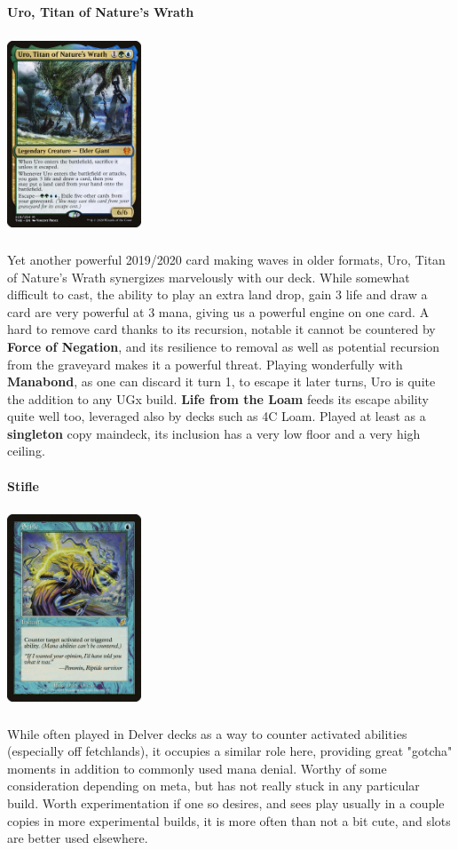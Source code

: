 \documentclass{report}
\begin{document}
\textbf{Uro, Titan of Nature's Wrath\\}
\begin{center}
\includegraphics [width = 4cm, height = 6cm] {uro}
\end{center}
Yet another powerful 2019/2020 card making waves in older formats, Uro, Titan of Nature's Wrath synergizes marvelously with our deck. While somewhat difficult to cast, the ability to play an extra land drop, gain 3 life and draw a card are very powerful at 3 mana, giving us a powerful engine on one card. A hard to remove card thanks to its recursion, notable it cannot be countered by \textbf{Force of Negation}, and its resilience to removal as well as potential recursion from the graveyard makes it a powerful threat. Playing wonderfully with \textbf{Manabond}, as one can discard it turn 1, to escape it later turns, Uro is quite the addition to any UGx build. \textbf{Life from the Loam} feeds its escape ability quite well too, leveraged also by decks such as 4C Loam. Played at least as a \textbf{singleton} copy maindeck, its inclusion has a very low floor and a very high ceiling.\\\\
\newpage
\textbf{Stifle}
\begin{center}
\includegraphics [width = 4cm, height = 6cm] {stifle}
\end{center}
While often played in Delver decks as a way to counter activated abilities (especially off fetchlands), it occupies a similar role here, providing great "gotcha" moments in addition to commonly used mana denial. Worthy of some consideration depending on meta, but has not really stuck in any particular build. Worth experimentation if one so desires, and sees play usually in a couple copies in more experimental builds, it is more often than not a bit cute, and slots are better used elsewhere.
\end{document}
